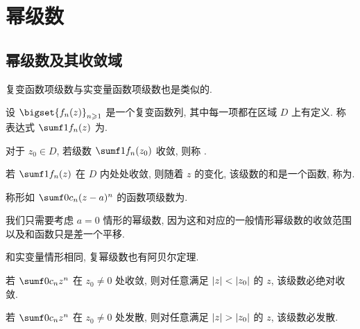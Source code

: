 \section{幂级数}

\subsection{幂级数及其收敛域}

复变函数项级数与实变量函数项级数也是类似的.

\begin{definition}
  \begin{enuma}
    \item 设 $\bigset{f_n(z)}_{n\ge 1}$ 是一个复变函数列, 其中每一项都在区域 $D$ 上有定义.
    称表达式 $\sumf1 f_n(z)$ 为.
    \item 对于 $z_0\in D$, 若级数 $\sumf1 f_n(z_0)$ 收敛, 则称 .
    \item 若 $\sumf1 f_n(z)$ 在 $D$ 内处处收敛, 则随着 $z$ 的变化, 该级数的和是一个函数, 称为.
  \end{enuma}
\end{definition}

\begin{definition}
  称形如 $\sumf0 c_n(z-a)^n$ 的函数项级数为.\footnotemark
\end{definition}

我们只需要考虑 $a=0$ 情形的幂级数, 因为这和对应的一般情形幂级数的收敛范围以及和函数只是差一个平移.

和实变量情形相同, 复幂级数也有阿贝尔定理.

\begin{theorem}[阿贝尔定理]
  \label{thm:abel-first}
  \begin{enuma}
    \item 若 $\sumf0 c_nz^n$ 在 $z_0\neq 0$ 处收敛, 则对任意满足 $\left|z\right|<\left|z_0\right|$ 的 $z$, 该级数必绝对收敛.\label{enum:abel-theorem-convergent}
    \item 若 $\sumf0 c_nz^n$ 在 $z_0\neq 0$ 处发散, 则对任意满足 $\abs{z}>\abs{z_0}$ 的 $z$, 该级数必发散.
  \end{enuma}
\end{theorem}

